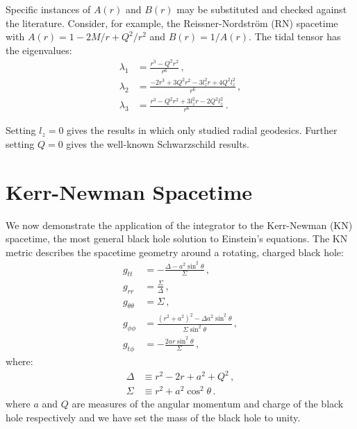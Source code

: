 \documentclass[11pt, twocolumn]{article}
\begin{document}
Specific instances of $A(r)$ and $B(r)$ may be substituted and checked against the literature. Consider, for example, the Reissner-Nordstr\"{o}m (RN) spacetime with $A(r) = 1 - 2M/r + Q^{2}/r^{2}$ and $B(r) = 1/A(r)$. The tidal tensor has the eigenvalues:
\begin{equation}
    \begin{split}
        \lambda_{1} &= \frac{r^{3} - Q^{2} r^{2}}{r^{6}} \, , \\
        \lambda_{2} &= \frac{-2r^{3} + 3Q^{2} r^{2} - 3l_{z}^{2} r + 4Q^{2}l_{z}^{2}}{r^{6}} \, , \\
        \lambda_{3} &= \frac{r^{3} - Q^{2} r^{2} + 3l_{z}^{2} r - 2Q^{2}l_{z}^{2}}{r^{6}} \, .
    \end{split}
\end{equation}

Setting $l_{z} = 0$ gives the results in \cite{Crispino2016} which only studied radial geodesics. Further setting $Q = 0$ gives the well-known Schwarzschild results.


\section{Kerr-Newman Spacetime} \label{sec:kn}


We now demonstrate the application of the integrator to the Kerr-Newman (KN) spacetime, the most general black hole solution to Einstein's equations. The KN metric describes the spacetime geometry around a rotating, charged black hole:
\begin{equation}
    \begin{split}
        g_{tt} &= -\frac{\Delta - a^{2} \sin^{2}{\theta}}{\Sigma} \, , \\
        g_{rr} &= \frac{\Sigma}{\Delta} \, , \\
        g_{\theta\theta} &= \Sigma \, , \\
        g_{\phi\phi} &= \frac{(r^{2} + a^{2})^{2} - \Delta a^{2} \sin^{2}{\theta}}{\Sigma \sin^{2}{\theta}} \, , \\
        g_{t\phi} &= -\frac{2 a r \sin^{2}{\theta}}{\Sigma} \, ,
    \end{split}
\end{equation}
where:
\begin{equation}
    \begin{split}
        \Delta &\equiv r^{2} - 2r + a^{2} + Q^{2} \, , \\
        \Sigma &\equiv r^{2} + a^{2} \cos^{2}{\theta} \, .
    \end{split}
\end{equation}
where $a$ and $Q$ are measures of the angular momentum and charge of the black hole respectively and we have set the mass of the black hole to unity.
\end{document}
